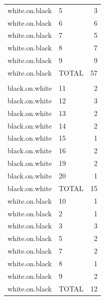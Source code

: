 \documentclass[
]{article}
\begin{document}
\begin{table}
\begin{tabular}[t]{llr}
\hspace{1em}white.on.black & 5 & 3\\
\hspace{1em}white.on.black & 6 & 6\\
\hspace{1em}white.on.black & 7 & 5\\
\hspace{1em}white.on.black & 8 & 7\\
\hspace{1em}white.on.black & 9 & 9\\
\hspace{1em}white.on.black & TOTAL & 57\\
\addlinespace[0.3em]
\multicolumn{3}{l}{\textbf{students}}\\
\hspace{1em}black.on.white & 11 & 2\\
\hspace{1em}black.on.white & 12 & 3\\
\hspace{1em}black.on.white & 13 & 2\\
\hspace{1em}black.on.white & 14 & 2\\
\hspace{1em}black.on.white & 15 & 1\\
\hspace{1em}black.on.white & 16 & 2\\
\hspace{1em}black.on.white & 19 & 2\\
\hspace{1em}black.on.white & 20 & 1\\
\hspace{1em}black.on.white & TOTAL & 15\\
\hspace{1em}white.on.black & 10 & 1\\
\hspace{1em}white.on.black & 2 & 1\\
\hspace{1em}white.on.black & 3 & 3\\
\hspace{1em}white.on.black & 5 & 2\\
\hspace{1em}white.on.black & 7 & 2\\
\hspace{1em}white.on.black & 8 & 1\\
\hspace{1em}white.on.black & 9 & 2\\
\hspace{1em}white.on.black & TOTAL & 12\\
\bottomrule
\end{tabular}
\end{table}
\end{document}
